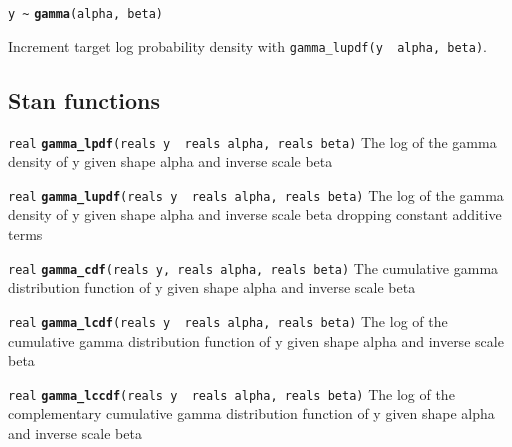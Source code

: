 \documentclass[
  10pt,
]{book}
\begin{document}
\texttt{y\ \textasciitilde{}} \textbf{\texttt{gamma}}\texttt{(alpha,\ beta)}

Increment target log probability density with \texttt{gamma\_lupdf(y\ \textbar{}\ alpha,\ beta)}.

\hypertarget{stan-functions-36}{%
\subsection{Stan functions}\label{stan-functions-36}}


\texttt{real} \textbf{\texttt{gamma\_lpdf}}\texttt{(reals\ y\ \textbar{}\ reals\ alpha,\ reals\ beta)}\newline
The log of the gamma density of y given shape alpha and inverse scale
beta


\texttt{real} \textbf{\texttt{gamma\_lupdf}}\texttt{(reals\ y\ \textbar{}\ reals\ alpha,\ reals\ beta)}\newline
The log of the gamma density of y given shape alpha and inverse scale
beta dropping constant additive terms


\texttt{real} \textbf{\texttt{gamma\_cdf}}\texttt{(reals\ y,\ reals\ alpha,\ reals\ beta)}\newline
The cumulative gamma distribution function of y given shape alpha and
inverse scale beta


\texttt{real} \textbf{\texttt{gamma\_lcdf}}\texttt{(reals\ y\ \textbar{}\ reals\ alpha,\ reals\ beta)}\newline
The log of the cumulative gamma distribution function of y given shape
alpha and inverse scale beta


\texttt{real} \textbf{\texttt{gamma\_lccdf}}\texttt{(reals\ y\ \textbar{}\ reals\ alpha,\ reals\ beta)}\newline
The log of the complementary cumulative gamma distribution function of
y given shape alpha and inverse scale beta
\end{document}
